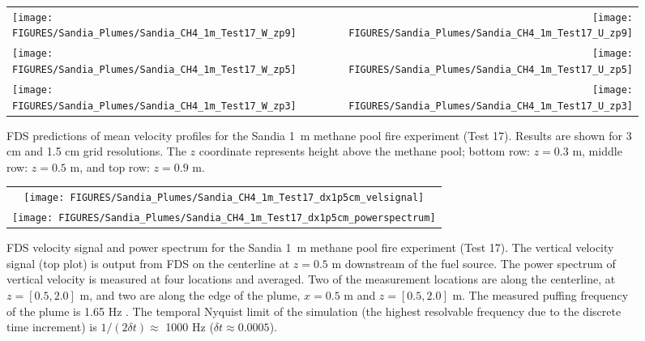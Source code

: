 \begin{figure}[p]
\begin{tabular*}{\textwidth}{l@{\extracolsep{\fill}}r}
\texttt{[image: FIGURES/Sandia\_Plumes/Sandia\_CH4\_1m\_Test17\_W\_zp9]} &
\texttt{[image: FIGURES/Sandia\_Plumes/Sandia\_CH4\_1m\_Test17\_U\_zp9]} \\
\texttt{[image: FIGURES/Sandia\_Plumes/Sandia\_CH4\_1m\_Test17\_W\_zp5]} &
\texttt{[image: FIGURES/Sandia\_Plumes/Sandia\_CH4\_1m\_Test17\_U\_zp5]} \\
\texttt{[image: FIGURES/Sandia\_Plumes/Sandia\_CH4\_1m\_Test17\_W\_zp3]} &
\texttt{[image: FIGURES/Sandia\_Plumes/Sandia\_CH4\_1m\_Test17\_U\_zp3]}
\end{tabular*}
\caption[Sandia 1~m methane pool fire (Test 17) mean velocity profiles.]
{FDS predictions of mean velocity profiles for the Sandia 1~m methane pool fire experiment (Test 17). Results are shown for 3 cm and 1.5 cm grid resolutions. The $z$ coordinate represents height above the methane pool; bottom row: $z=0.3$ m, middle row: $z=0.5$ m, and top row: $z=0.9$ m.}
\label{Sandia_CH4_1m_Test17_velocity}
\end{figure}

\begin{figure}[p]
\begin{center}
\begin{tabular}{c}
\texttt{[image: FIGURES/Sandia\_Plumes/Sandia\_CH4\_1m\_Test17\_dx1p5cm\_velsignal]} \\
\texttt{[image: FIGURES/Sandia\_Plumes/Sandia\_CH4\_1m\_Test17\_dx1p5cm\_powerspectrum]}
\end{tabular}
\end{center}
\caption[Sandia 1~m methane pool fire velocity signal and power spectrum.]
{FDS velocity signal and power spectrum for the Sandia 1~m methane pool fire experiment (Test 17).  The vertical velocity signal (top plot) is output from FDS on the centerline at $z=0.5$ m downstream of the fuel source.  The power spectrum of vertical velocity is measured at four locations and averaged.  Two of the measurement locations are along the centerline, at $z=[0.5, 2.0]$ m, and two are along the edge of the plume, $x = 0.5$ m and $z=[0.5, 2.0]$ m.  The measured puffing frequency of the plume is 1.65 Hz \cite{Tieszen:2002}.  The temporal Nyquist limit of the simulation (the highest resolvable frequency due to the discrete time increment) is $1/(2\delta t) \approx$ 1000 Hz ($\delta t \approx 0.0005$).}
\label{Sandia_CH4_1m_Test17_spectrum}
\end{figure}

